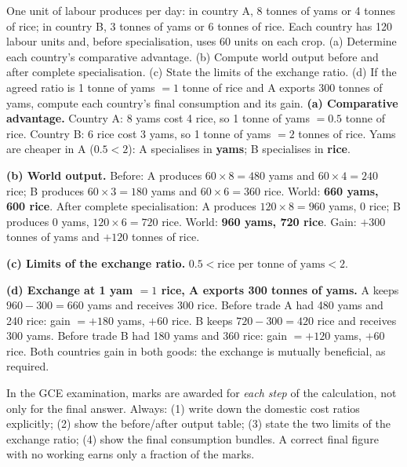 \documentclass[11pt]{article}
\begin{document}
\begin{exoresolu}
One unit of labour produces per day: in country A, 8 tonnes of yams or 4 tonnes of rice; in country B, 3 tonnes of yams or 6 tonnes of rice. Each country has 120 labour units and, before specialisation, uses 60 units on each crop. (a) Determine each country's comparative advantage. (b) Compute world output before and after complete specialisation. (c) State the limits of the exchange ratio. (d) If the agreed ratio is 1 tonne of yams $= 1$ tonne of rice and A exports 300 tonnes of yams, compute each country's final consumption and its gain.
\tcblower
\textbf{(a) Comparative advantage.} Country A: 8 yams cost 4 rice, so 1 tonne of yams $= 0.5$ tonne of rice. Country B: 6 rice cost 3 yams, so 1 tonne of yams $= 2$ tonnes of rice. Yams are cheaper in A ($0.5 < 2$): A specialises in \textbf{yams}; B specialises in \textbf{rice}.

\textbf{(b) World output.}
Before: A produces $60 \times 8 = 480$ yams and $60 \times 4 = 240$ rice; B produces $60 \times 3 = 180$ yams and $60 \times 6 = 360$ rice. World: \textbf{660 yams, 600 rice}.
After complete specialisation: A produces $120 \times 8 = 960$ yams, 0 rice; B produces 0 yams, $120 \times 6 = 720$ rice. World: \textbf{960 yams, 720 rice}.
Gain: $+300$ tonnes of yams and $+120$ tonnes of rice.

\textbf{(c) Limits of the exchange ratio.} $0.5 < \text{rice per tonne of yams} < 2$.

\textbf{(d) Exchange at 1 yam $= 1$ rice, A exports 300 tonnes of yams.}
A keeps $960 - 300 = 660$ yams and receives 300 rice. Before trade A had 480 yams and 240 rice: gain $= +180$ yams, $+60$ rice.
B keeps $720 - 300 = 420$ rice and receives 300 yams. Before trade B had 180 yams and 360 rice: gain $= +120$ yams, $+60$ rice.
Both countries gain in both goods: the exchange is mutually beneficial, as required.
\end{exoresolu}

\begin{methode}
In the GCE examination, marks are awarded for \emph{each step} of the calculation, not only for the final answer. Always: (1) write down the domestic cost ratios explicitly; (2) show the before/after output table; (3) state the two limits of the exchange ratio; (4) show the final consumption bundles. A correct final figure with no working earns only a fraction of the marks.
\end{methode}
\end{document}
